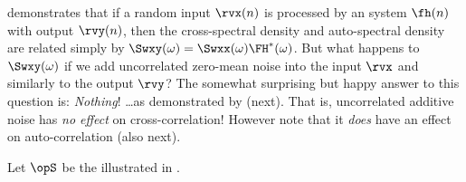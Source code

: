  demonstrates that if a random input $\rvx(n)$ is processed by an  system
$\fh(n)$ with output $\rvy(n)$, then the cross-spectral density and auto-spectral density are 
related simply by
$\Swxy(\omega)=\Swxx(\omega)\FH^\ast(\omega)$. 
But what happens to $\Swxy(\omega)$ if we add uncorrelated zero-mean noise into the input $\rvx$
and similarly to the output $\rvy$?
The somewhat surprising but happy answer to this question is: \emph{Nothing}!
\ldots as demonstrated by  (next). 
That is, uncorrelated additive noise has \emph{no effect} on cross-correlation!
However note that it \emph{does} have an effect on auto-correlation (also next).
\begin{corollary}
\label{cor:sysH_addnoise_lti}
Let $\opS$ be the  illustrated in .
\end{corollary}
